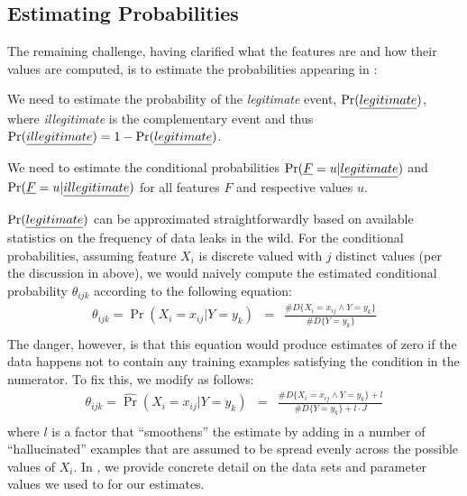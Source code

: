 \subsection{Estimating Probabilities}\label{Se:estprob}

The remaining challenge, having clarified what the features are and how their values are computed, is to estimate the probabilities appearing in :
\begin{compactitem}
	\item We need to estimate the probability of the \emph{legitimate} event, $\Pr(\emph{legitimate})$, where \emph{illegitimate} is the complementary event and thus 
	$\Pr(\emph{illegitimate}) = 1 - \Pr(\emph{legitimate})$.
	\item We need to estimate the conditional probabilities $\Pr(\emph{F} = u | \emph{legitimate})$ and $\Pr(\emph{F} = u | \emph{illegitimate})$ for all features $F$
	and respective values $u$.
\end{compactitem}

$\Pr(\emph{legitimate})$ can be approximated straightforwardly based on available statistics on the frequency of data leaks in the wild. For the conditional probabilities, assuming feature $X_i$ is discrete valued with $j$ distinct values (per the discussion in  above), we would naively compute the 
estimated conditional probability $\theta_{ijk}$ according to the following equation: 
\begin{equation}\label{Eq:naiveEstimate}
	\begin{array}{lcr}
		\theta_{ijk} = \widehat{\Pr}(X_i = x_{ij} | Y=y_k) & = & \frac{\# D \{ X_i = x_{ij} \wedge Y = y_k \}}{\# D \{ Y = y_k \}} \\ 
	\end{array}
\end{equation}
The danger, however, is that this equation would produce estimates of zero if the data happens not to contain any training examples satisfying the condition in the numerator. To fix this, we modify  as follows:
\begin{equation}\label{Eq:smoothEstimate}
	\begin{array}{lcr}
		\theta_{ijk} = \widehat{\Pr}(X_i = x_{ij} | Y=y_k) & = & \frac{\# D \{ X_i = x_{ij} \wedge Y = y_k \} + l}{\# D \{ Y = y_k \} + l \cdot J} \\ 
	\end{array}
\end{equation}
where $l$ is a factor that ``smoothens'' the estimate by adding in a number of ``hallucinated'' examples that are assumed to be spread evenly across the possible values of $X_i$. In , we provide concrete detail on the data sets and parameter values we used to for our estimates.



